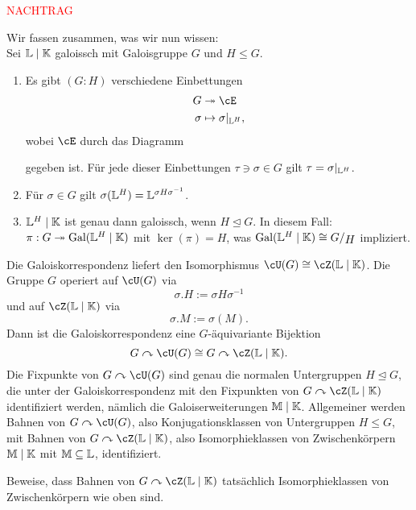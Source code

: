 \textcolor{red}{NACHTRAG}\\
\begin{bemerkung}
Wir fassen zusammen, was wir nun wissen:\\
Sei $\mathbb{L} \mid \mathbb{K}$ galoissch mit Galoisgruppe $G$ und $H \leq G$.
\begin{enumerate}
\item Es gibt $(G:H)$ verschiedene Einbettungen
\begin{equation}
\begin{split}
G &\twoheadrightarrow \cE\\
\sigma &\mapsto \sigma|_{\L^H},
\end{split}
\end{equation}
wobei $\cE$ durch das Diagramm
\begin{center}
\end{center}
gegeben ist. Für jede dieser Einbettungen $\tau \ni \sigma \in G$ gilt $\tau = \sigma|_{\mathbb{L}^H}$.
\item Für $\sigma \in G$ gilt $\sigma(\mathbb{L}^H)=\mathbb{L}^{\sigma H \sigma^{-1}}$.
\item $\mathbb{L}^H \mid \mathbb{K}$ ist genau dann galoissch, wenn $H\trianglelefteq G$. In diesem Fall: $\pi: G \twoheadrightarrow \operatorname{\text{Gal}}(\mathbb{L}^H \mid \mathbb{K})$ mit $\ker (\pi) = H$, was $\Gal(\L^H \mid \K) \cong \quotient{G}{H}$ impliziert.
\end{enumerate}
\end{bemerkung}
\begin{bemerkung}
Die Galoiskorrespondenz liefert den Isomorphismus $\cU (G) \cong \cZ (\L \mid \K)$. Die Gruppe $G$ operiert auf $\cU(G)$ via
\begin{equation}
\sigma.H := \sigma H \sigma^{-1}
\end{equation}
und auf $\cZ(\L \mid \K)$ via
\begin{equation}
\sigma.M := \sigma(M).
\end{equation}
Dann ist die Galoiskorrespondenz eine $G$-äquivariante Bijektion
\begin{equation}
G \acts \cU(G) \cong G \acts \cZ(\L \mid \K).
\end{equation}
Die Fixpunkte von $G \acts \cU(G)$ sind genau die normalen Untergruppen $H \trianglelefteq G$, die unter der Galoiskorrespondenz mit den Fixpunkten von $G \acts \cZ(\L \mid \K)$ identifiziert werden, nämlich die Galoiserweiterungen $\mathbb{M} \mid \mathbb{K}$. Allgemeiner werden Bahnen von $G \acts \cU(G)$, also Konjugationsklassen von Untergruppen $H \leq G$, mit Bahnen von $G \acts \cZ(\L \mid \K)$, also Isomorphieklassen von Zwischenkörpern $\mathbb{M} \mid \mathbb{K}$ mit $\mathbb{M} \subseteq \mathbb{L}$, identifiziert.
\end{bemerkung}
\begin{übung}
Beweise, dass Bahnen von $G \acts \cZ(\L \mid \K)$ tatsächlich Isomorphieklassen von Zwischenkörpern wie oben sind.
\end{übung}

